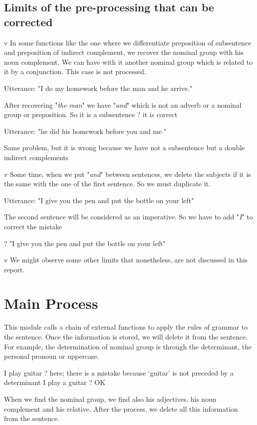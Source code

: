 \documentclass[twoside,a4paper,10pt]{report}
\newcommand{\dokutitleleveltwo}[1]{\chapter{#1}}
\newcommand{\dokutitleleveltree}[1]{\section{#1}}
\newcommand{\dokuitalic}[1]{\textsl{#1}}
\begin{document}
\dokutitleleveltree{Limits of the pre-processing that can be corrected}
\label{751e28b2f79ada5fd6de3cc8dcb5ed90}%
v  In some functions like the one where we differentiate preposition of subsentence and preposition of indirect complement, we recover the nominal group with his noun complement. We can have with it another nominal group which is related to it by a conjunction. This case is not processed.


\small
\begin{verbatimtab}
  Utterance: "I do my homework before the man and he arrive."
\end{verbatimtab}
\normalsize
After recovering "\dokuitalic{the man}" we have "\dokuitalic{and}" which is not an adverb or a nominal group or preposition. So it is a subsentence ? it is correct


\small
\begin{verbatimtab}
  Utterance: "he did his homework before you and me."
\end{verbatimtab}
\normalsize
Same problem, but it is wrong because we have not a subsentence but a double indirect complements

v  Some time, when we put "\dokuitalic{and}" between sentences, we delete the subjects if it is the same with the one of the first sentence. So we must duplicate it.


\small
\begin{verbatimtab}
  Utterance: "I give you the pen and put the bottle on your left"
\end{verbatimtab}
\normalsize
The second sentence will be considered as an imperative. So we have to add "\dokuitalic{I}" to correct the mistake


\small
\begin{verbatimtab}
  ? "I give you the pen and put the bottle on your left"
\end{verbatimtab}
\normalsize

v  We might observe some other limits that nonetheless, are not discussed in this report.


\dokutitleleveltwo{Main Process}
\label{0e76170b5e24f80d8e04eca241527e68}%
This module calls a chain of external functions to apply the rules of grammar to the sentence.  Once the information is stored, we will delete it from the sentence. For example, the determination of nominal group is through the determinant, the personal pronoun or uppercase.


\small
\begin{verbatimtab}
  I play guitar ? here; there is a mistake because ‘guitar’ is not preceded by a determinant
  I play a guitar ? OK
\end{verbatimtab}
\normalsize
When we find the nominal group, we find also his adjectives, his noun complement and his relative. After the process, we delete all this information from the sentence.
\end{document}
